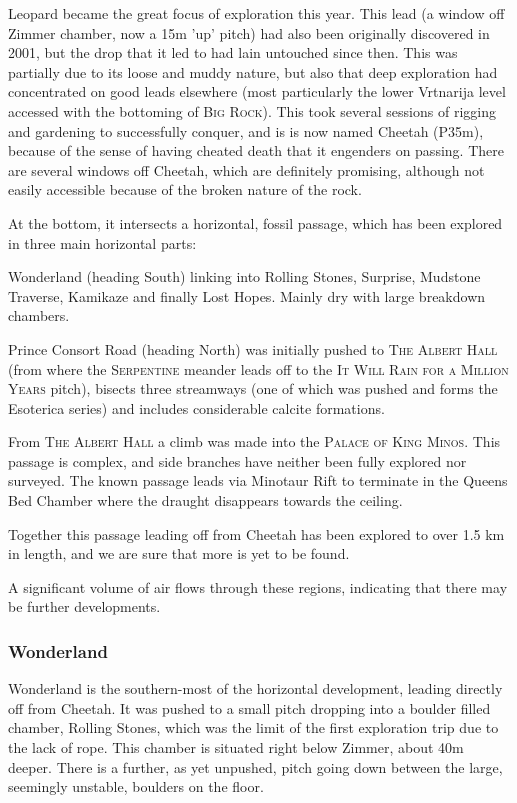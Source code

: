 \documentclass[english,a4]{article}
\begin{document}
Leopard became the great focus of exploration this year. This lead
(a window off Zimmer chamber, now a 15m 'up' pitch) had also been
originally discovered in 2001, but the drop that it led to had lain
untouched since then. 
This was partially due to its loose and muddy nature, but also that deep
exploration had concentrated on good leads elsewhere (most particularly the
lower Vrtnarija level accessed with the bottoming of \textsc{Big Rock}). This
took several sessions of rigging and gardening to successfully conquer, and is
is now named Cheetah (P35m), because of the sense of having cheated death that
it engenders on passing. There are several windows off Cheetah, which are
definitely promising, although not easily accessible because of the broken nature
of the rock.

At the bottom, it intersects a horizontal, fossil passage, which has
been explored in three main horizontal parts:

Wonderland (heading South) linking into Rolling Stones, Surprise,
Mudstone Traverse, Kamikaze and finally Lost Hopes. Mainly dry with large breakdown chambers. 

Prince Consort Road (heading North) was initially pushed to \textsc{The Albert
Hall} (from where the \textsc{Serpentine} meander leads off to the \textsc{It
Will Rain for a Million Years} pitch), bisects three streamways (one of which
was pushed and forms the Esoterica series) and includes considerable calcite
formations.

From \textsc{The Albert Hall} a climb was made into the
\textsc{Palace of King Minos}. This passage is complex, and side branches have neither been fully
explored nor surveyed. The known passage leads via Minotaur Rift to terminate in the
Queens Bed Chamber where the draught disappears towards the ceiling.

Together this passage leading off from Cheetah has been explored to over 1.5 km in length,
and we are sure that more is yet to be found. 

A significant volume of air flows through these regions, indicating that there may
be further developments.

\subsubsection{Wonderland}

Wonderland is the southern-most of the horizontal development, leading
directly off from Cheetah. It was pushed to a small pitch dropping
into a boulder filled chamber, Rolling Stones, which was the limit of the first
exploration trip due to the lack of rope.  This chamber is situated right below
Zimmer, about 40m deeper. There is a further, as yet unpushed, pitch going down
between the large, seemingly unstable, boulders on the floor.
\end{document}
